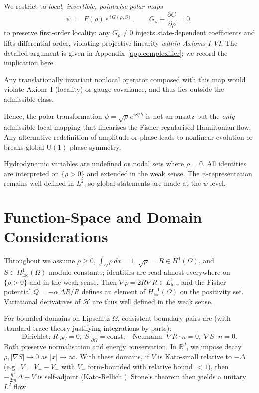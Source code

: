 \documentclass[11pt,a4paper]{article}
\numberwithin{equation}{section}
\theoremstyle{thmcompact}
\theoremstyle{remark}
\begin{document}
We restrict to \emph{local, invertible, pointwise polar maps}
\[
\psi \;=\; F(\rho)\,e^{\,i\,G(\rho,S)} ,
\qquad G_\rho \equiv \frac{\partial G}{\partial \rho}=0,
\]
to preserve first-order locality: any \(G_\rho\neq 0\) injects state-dependent
coefficients and lifts differential order, violating projective linearity
\emph{within Axioms I-VI}. The detailed argument is given in
Appendix~\ref{app:complexifier}; we record the implication here.

Any translationally invariant nonlocal operator composed with this map would
violate Axiom~I (locality) or gauge covariance, and thus lies outside the
admissible class.

Hence, the polar transformation $\psi=\sqrt\rho\,e^{iS/\hbar}$ is not an
ansatz but the \emph{only} admissible local mapping that linearises the
Fisher-regularised Hamiltonian flow. Any alternative redefinition of amplitude
or phase leads to nonlinear evolution or breaks global $\mathrm{U}(1)$ phase
symmetry.

Hydrodynamic variables are undefined on nodal sets where $\rho=0$. All
identities are interpreted on $\{\rho>0\}$ and extended in the weak sense. The
$\psi$-representation remains well defined in $L^2$, so global statements are
made at the $\psi$ level.
	
\section{Function-Space and Domain Considerations}\label{sec:function-space}

 Throughout we assume $\rho\ge0$, $\int_\Omega\rho\,dx=1$, $\sqrt{\rho}=R\in H^{1}(\Omega)$, and $S\in H^{1}_{\mathrm{loc}}(\Omega)$ modulo constants; identities are read almost everywhere on $\{\rho>0\}$ and in the weak sense. Then $\nabla\rho=2R\nabla R\in L^{1}_{\mathrm{loc}}$, and the Fisher potential
\(
Q=-\alpha\,\Delta R/R
\)
defines an element of $H^{-1}_{\mathrm{loc}}(\Omega)$ on the positivity set. Variational derivatives of $\mathcal H$ are thus well defined in the weak sense.
	
For bounded domains on Lipschitz $\Omega$, consistent boundary pairs are (with standard trace theory justifying integrations by parts):
\[
\text{Dirichlet: } R|_{\partial\Omega}=0,\; S|_{\partial\Omega}=\text{const};
\quad
\text{Neumann: } \nabla R\!\cdot\!n=0,\; \nabla S\!\cdot\!n=0.
\]
Both preserve normalisation and energy conservation.
In $\mathbb{R}^d$, we impose decay $\rho,|\nabla S|\!\to\!0$ as $|x|\!\to\!\infty$.
With these domains, if $V$ is Kato-small relative to $-\Delta$ (e.g.\ $V=V_{+}-V_{-}$ with $V_{-}$ form-bounded with relative bound $<1$), then $-\frac{\hbar^{2}}{2m}\Delta+V$ is self-adjoint (Kato-Rellich \cite{kato1995}). Stone’s theorem then yields a unitary $L^{2}$ flow.
\end{document}
